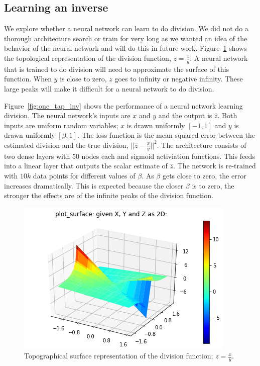 \subsection{Learning an inverse}

We explore whether a neural network can learn to do division.  We did not do a thorough architecture search or train for very long as we wanted an idea of the behavior of the neural network and will do this in future work.  
Figure~\ref{fig:div_fx} shows the topological representation of the division function, $z=\frac{x}{y}$.  A neural network that is trained to do division will need to approximate the surface of this function.  
When $y$ is close to zero, $z$ goes to infinity or negative infinity.  These large peaks will make it difficult for a neural network to do division.  

Figure~\ref{fig:one_tap_inv} shows the performance of a neural network learning division.
The neural network's inputs are $x$ and $y$ and the output is $\hat{z}$.  Both inputs are uniform random variables; $x$ is drawn uniformly $[-1,1]$ and $y$ is drawn uniformly $[\beta,1]$. 
The loss function is the mean squared error between the estimated division and the true division, $||\hat{z}-\frac{x}{y}||^2$.
The architecture consists of two dense layers with $50$ nodes each and sigmoid activiation functions.  This feeds into a linear layer that outputs the scalar estimate of $\hat{z}$.  
The network is re-trained with $10k$ data points for different values of $\beta$. As $\beta$ gets close to zero, the error increases dramatically.  This is expected because the closer $\beta$ is to zero, the stronger the effects are of the infinite peaks of the division function.

\begin{figure}
\begin{center}
\includegraphics{figures/equal/Division_Function_plot.png}
\caption{Topographical surface representation of the division function; $z=\frac{x}{y}$.}
\label{fig:div_fx}
\end{center}
\end{figure}

